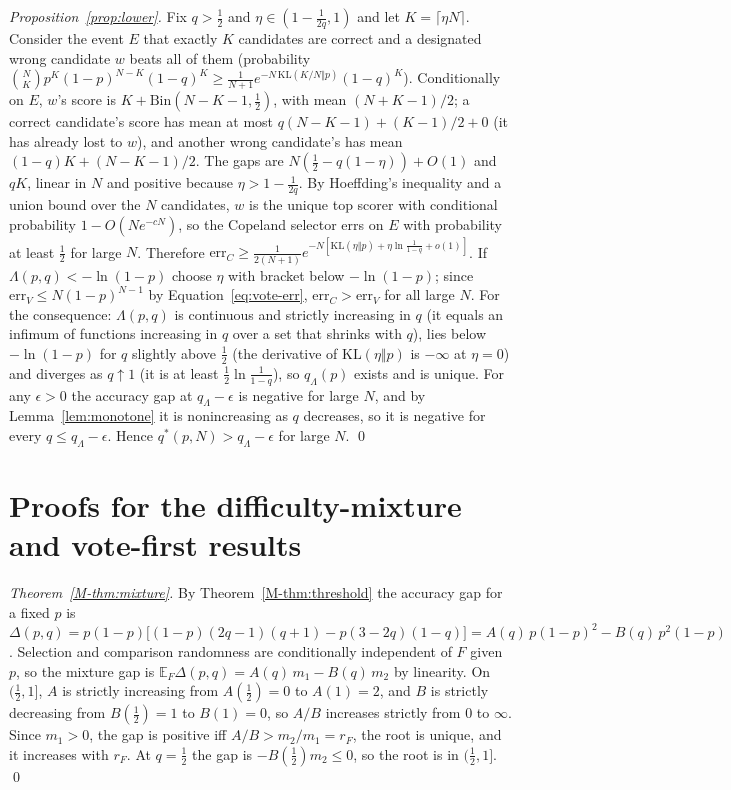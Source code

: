 \emph{Proposition~\ref{prop:lower}.} Fix $q>\tfrac12$ and $\eta\in(1-\tfrac1{2q},1)$ and let $K=\lceil\eta N\rceil$. Consider the event $E$ that
exactly $K$ candidates are correct and a designated wrong candidate $w$ beats all of them (probability
$\binom NK p^K(1-p)^{N-K}(1-q)^K\ge \frac{1}{N+1}e^{-N\,\mathrm{KL}(K/N\Vert p)}(1-q)^K$). Conditionally on $E$, $w$'s score is $K+\mathrm{Bin}(N-K-1,\tfrac12)$,
with mean $(N+K-1)/2$; a correct candidate's score has mean at most $q(N-K-1)+(K-1)/2+0$ (it has already lost to $w$), and another wrong
candidate's has mean $(1-q)K+(N-K-1)/2$. The gaps are $N(\tfrac12-q(1-\eta))+O(1)$ and $qK$, linear in $N$ and positive because
$\eta>1-\tfrac1{2q}$. By Hoeffding's inequality and a union bound over the $N$ candidates, $w$ is the unique top scorer with conditional probability
$1-O(N e^{-cN})$, so the Copeland selector errs on $E$ with probability at least $\tfrac12$ for large $N$. Therefore
$\mathrm{err}_C\ge\frac{1}{2(N+1)}e^{-N[\mathrm{KL}(\eta\Vert p)+\eta\ln\frac1{1-q}+o(1)]}$. If $\Lambda(p,q)<-\ln(1-p)$ choose $\eta$
with bracket below $-\ln(1-p)$; since $\mathrm{err}_V\le N(1-p)^{N-1}$ by Equation~\eqref{eq:vote-err}, $\mathrm{err}_C>\mathrm{err}_V$ for all large $N$.
For the consequence: $\Lambda(p,q)$ is continuous and strictly increasing in $q$ (it equals an infimum of functions
increasing in $q$ over a set that shrinks with $q$), lies below $-\ln(1-p)$ for $q$ slightly above $\tfrac12$ (the derivative of $\mathrm{KL}(\eta\Vert p)$ is $-\infty$ at $\eta=0$) and
diverges as $q\uparrow1$ (it is at least $\tfrac12\ln\frac1{1-q}$), so $q_\Lambda(p)$ exists and is unique. For any $\epsilon>0$ the accuracy gap at $q_\Lambda-\epsilon$ is negative for large
$N$, and by Lemma~\ref{lem:monotone} it is nonincreasing as $q$ decreases, so it is negative for every $q\le q_\Lambda-\epsilon$. Hence
$q^{*}(p,N)>q_\Lambda-\epsilon$ for large $N$. \qed

\section{Proofs for the difficulty-mixture and vote-first results}
\label{sec:s-new-proofs}

\emph{Theorem~\ref{M-thm:mixture}.} By Theorem~\ref{M-thm:threshold} the accuracy gap for a fixed $p$ is
$\Delta(p,q)=p(1-p)\bigl[(1-p)(2q-1)(q+1)-p(3-2q)(1-q)\bigr]=A(q)\,p(1-p)^2-B(q)\,p^2(1-p)$.
Selection and comparison randomness are conditionally independent of $F$ given $p$, so the mixture gap is
$\mathbb{E}_F\Delta(p,q)=A(q)\,m_1-B(q)\,m_2$ by linearity. On $(\tfrac12,1]$, $A$ is strictly increasing
from $A(\tfrac12)=0$ to $A(1)=2$, and $B$ is strictly decreasing from $B(\tfrac12)=1$ to $B(1)=0$, so
$A/B$ increases strictly from $0$ to $\infty$. Since $m_1>0$, the gap is positive iff $A/B>m_2/m_1=r_F$, the root is
unique, and it increases with $r_F$. At $q=\tfrac12$ the gap is $-B(\tfrac12)m_2\le0$, so the root is
in $(\tfrac12,1]$. \qed

